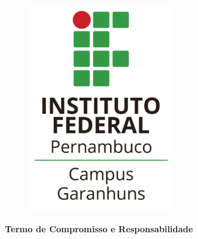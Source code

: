 \documentclass[12pt, a4paper]{article}
\begin{document}
\begin{figure}
  \centering
  \includegraphics{logo-ifpe-garanhuns-mini}
\end{figure}

\vspace{1cm}

\begin{center}
  \LARGE
  \textbf{Termo de Compromisso e Responsabilidade}
\end{center}

\vspace{0.5cm}
\end{document}
